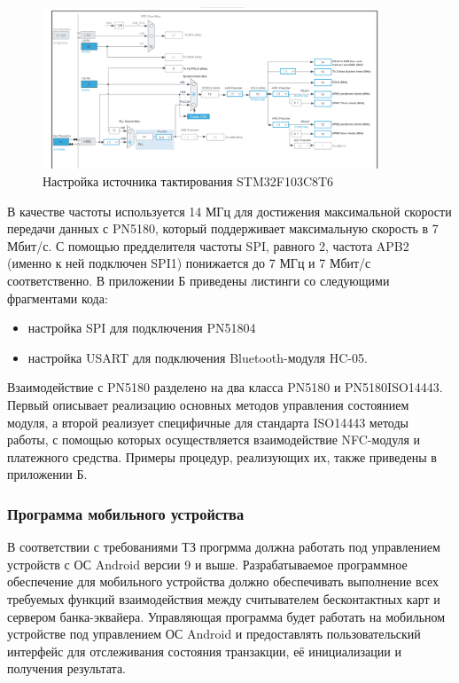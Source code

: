 \begin{figure}[H]
    \centering
    \includegraphics[width=0.9\textwidth]{images/design/stm_cube}
    \caption{\centering Настройка источника тактирования STM32F103C8T6}
    \label{fig:stm_cube}
\end{figure}

В качестве частоты используется 14 МГц для достижения максимальной скорости передачи данных с PN5180, который поддерживает максимальную скорость в 7 Мбит/с.
С помощью предделителя частоты SPI, равного 2, частота APB2 (именно к ней подключен SPI1) понижается до 7 МГц и 7 Мбит/с соответственно.
В приложении Б приведены листинги со следующими фрагментами кода:
\begin{itemize}
    \item настройка SPI для подключения PN51804
    \item настройка USART для подключения Bluetooth-модуля HC-05.
\end{itemize}

Взаимодействие с PN5180 разделено на два класса PN5180 и PN5180ISO14443.
Первый описывает реализацию основных методов управления состоянием модуля, а второй реализует специфичные для стандарта ISO14443 методы работы, с помощью которых осуществляется взаимодействие NFC-модуля и платежного средства.
Примеры процедур, реализующих их, также приведены в приложении Б.


\subsubsection{Программа мобильного устройства}

В соответствии с требованиями ТЗ прогрмма должна работать под управлением устройств с ОС Android версии 9 и выше.
Разрабатываемое программное обеспечение для мобильного устройства должно обеспечивать выполнение всех требуемых функций взаимодействия между считывателем бесконтактных карт и сервером банка-эквайера.
Управляющая программа будет работать на мобильном устройстве под управлением ОС Android и предоставлять пользовательский интерфейс для отслеживания состояния транзакции, её инициализации и получения результата.

